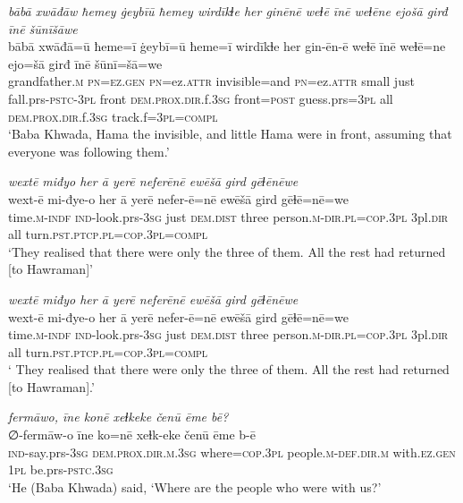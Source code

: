 \ea \label{BP.105}
\textit{bābā xwāđāw ħemey ġeybīū ħemey wirdīkɫe her ginēnē weɫē īnē weɫēne ejošā girđ īnē šūnīšāwe} \\ 
\gll bābā xwāđā=ū ħeme=ī ġeybī=ū ħeme=ī wirdīkɫe her gin-ēn-ē weɫē īnē weɫē=ne ejo=šā girđ īnē šūnī=šā=we \\ 
 grandfather\textsc{.m} \textsc{pn}\textsc{=ez.gen} \textsc{pn}=ez.\textsc{attr} invisible=and \textsc{pn}=ez.\textsc{attr} small just fall.prs\textsc{-pstc}\textsc{-3pl} front \textsc{dem.prox}\textsc{.dir}.f\textsc{.3sg} front\textsc{=\textsc{post}} guess.prs\textsc{=3pl} all \textsc{dem.prox}\textsc{.dir}.f\textsc{.3sg} track.f\textsc{=3pl}\textsc{=compl} \\ 
\glt `Baba Khwada, Hama the invisible, and little Hama were in front, assuming that everyone was following them.'
\z 
 
\ea \label{BP.107}
\textit{wextē miđyo her ā yerē neferēnē ewēšā gird gēɫēnēwe} \\ 
\gll wext-ē mi-đye-o her ā yerē nefer-ē=nē ewēšā gird gēɫē=nē=we \\ 
 time\textsc{.m}\textsc{-indf} \textsc{ind-}look.prs\textsc{-3sg} just \textsc{dem.dist} three person\textsc{.m}\textsc{-dir}\textsc{.pl}\textsc{=cop}\textsc{.3pl} 3pl\textsc{.dir} all turn\textsc{.pst}\textsc{.ptcp}\textsc{.pl}\textsc{=cop}\textsc{.3pl}\textsc{=compl} \\ 
\glt `They realised that there were only the three of them. All the rest had returned [to Hawraman]'
\z 
 
\ea \label{BP.108}
\textit{wextē miđyo her ā yerē neferēnē ewēšā gird gēɫēnēwe} \\ 
\gll wext-ē mi-đye-o her ā yerē nefer-ē=nē ewēšā gird gēɫē=nē=we \\ 
 time\textsc{.m}\textsc{-indf} \textsc{ind-}look.prs\textsc{-3sg} just \textsc{dem.dist} three person\textsc{.m}\textsc{-dir}\textsc{.pl}\textsc{=cop}\textsc{.3pl} 3pl\textsc{.dir} all turn\textsc{.pst}\textsc{.ptcp}\textsc{.pl}\textsc{=cop}\textsc{.3pl}\textsc{=compl} \\ 
\glt ` They realised that there were only the three of them. All the rest had returned [to Hawraman].'
\z 
 
\ea \label{BP.109}
\textit{fermāwo, īne konē xeɫkeke čenū ēme bē?} \\ 
\gll ∅-fermāw-o īne ko=nē xeɫk-eke čenū ēme b-ē \\ 
 \textsc{ind-}say.prs\textsc{-3sg} \textsc{dem.prox}\textsc{.dir}\textsc{.m}\textsc{.3sg} where\textsc{=cop}\textsc{.3pl} people\textsc{.m}\textsc{-def}\textsc{.dir}\textsc{.m} with\textsc{.ez.gen} \textsc{1pl} be.prs\textsc{-pstc}\textsc{.3sg} \\ 
\glt `He (Baba Khwada) said, ‘Where are the people who were with us?'
\z 
 
